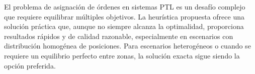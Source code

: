 \documentclass{hw-template}
\begin{document}
El problema de asignación de órdenes en sistemas PTL es un desafío complejo que requiere equilibrar múltiples objetivos. La heurística propuesta ofrece una solución práctica que, aunque no siempre alcanza la optimalidad, proporciona resultados rápidos y de calidad razonable, especialmente en escenarios con distribución homogénea de posiciones. Para escenarios heterogéneos o cuando se requiere un equilibrio perfecto entre zonas, la solución exacta sigue siendo la opción preferida.


\end{document}
